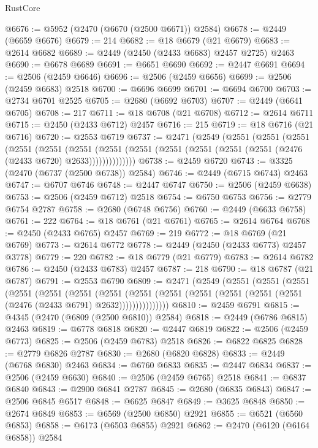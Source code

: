 \begin{lexlean}{RustCore}
\begin{coremodule}
@6676 := @5952 (@2470 (@6670 (@2500 @6671)) @2584)
@6678 := @2449 (@6659 @6676)
@6679 := 214
@6682 := @18 @6679 (@21 @6679)
@6683 := @2614 @6682
@6689 := @2449 (@2450 (@2433 @6683) @2457 @2725) @2463
@6690 := @6678 @6689
@6691 := @6651 @6690
@6692 := @2447 @6691
@6694 := @2506 (@2459 @6646)
@6696 := @2506 (@2459 @6656)
@6699 := @2506 (@2459 @6683) @2518
@6700 := @6696 @6699
@6701 := @6694 @6700
@6703 := @2734 @6701 @2525
@6705 := @2680 (@6692 @6703)
@6707 := @2449 (@6641 @6705)
@6708 := 217
@6711 := @18 @6708 (@21 @6708)
@6712 := @2614 @6711
@6715 := @2450 (@2433 @6712) @2457
@6716 := 215
@6719 := @18 @6716 (@21 @6716)
@6720 := @2553 @6719
@6737 := @2471
    (@2549
      (@2551
        (@2551
          (@2551
            (@2551
              (@2551
                (@2551
                  (@2551 (@2551 (@2551 (@2551 (@2551 (@2551 (@2476 (@2433 @6720) @2633))))))))))))))
@6738 := @2459 @6720
@6743 := @3325 (@2470 (@6737 (@2500 @6738)) @2584)
@6746 := @2449 (@6715 @6743) @2463
@6747 := @6707 @6746
@6748 := @2447 @6747
@6750 := @2506 (@2459 @6638)
@6753 := @2506 (@2459 @6712) @2518
@6754 := @6750 @6753
@6756 := @2779 @6754 @2787
@6758 := @2680 (@6748 @6756)
@6760 := @2449 (@6633 @6758)
@6761 := 222
@6764 := @18 @6761 (@21 @6761)
@6765 := @2614 @6764
@6768 := @2450 (@2433 @6765) @2457
@6769 := 219
@6772 := @18 @6769 (@21 @6769)
@6773 := @2614 @6772
@6778 := @2449 (@2450 (@2433 @6773) @2457 @3778)
@6779 := 220
@6782 := @18 @6779 (@21 @6779)
@6783 := @2614 @6782
@6786 := @2450 (@2433 @6783) @2457
@6787 := 218
@6790 := @18 @6787 (@21 @6787)
@6791 := @2553 @6790
@6809 := @2471
    (@2549
      (@2551
        (@2551
          (@2551
            (@2551
              (@2551
                (@2551
                  (@2551
                    (@2551
                      (@2551 (@2551 (@2551 (@2551 (@2551 (@2476 (@2433 @6791) @2632)))))))))))))))
@6810 := @2459 @6791
@6815 := @4345 (@2470 (@6809 (@2500 @6810)) @2584)
@6818 := @2449 (@6786 @6815) @2463
@6819 := @6778 @6818
@6820 := @2447 @6819
@6822 := @2506 (@2459 @6773)
@6825 := @2506 (@2459 @6783) @2518
@6826 := @6822 @6825
@6828 := @2779 @6826 @2787
@6830 := @2680 (@6820 @6828)
@6833 := @2449 (@6768 @6830) @2463
@6834 := @6760 @6833
@6835 := @2447 @6834
@6837 := @2506 (@2459 @6630)
@6840 := @2506 (@2459 @6765) @2518
@6841 := @6837 @6840
@6843 := @2900 @6841 @2787
@6845 := @2680 (@6835 @6843)
@6847 := @2506 @6845 @6517
@6848 := @6625 @6847
@6849 := @3625 @6848
@6850 := @2674 @6849
@6853 := @6569 (@2500 @6850) @2921
@6855 := @6521 (@6560 @6853)
@6858 := @6173 (@6503 @6855) @2921
@6862 := @2470 (@6120 (@6164 @6858)) @2584

\end{coremodule}
\end{lexlean}
